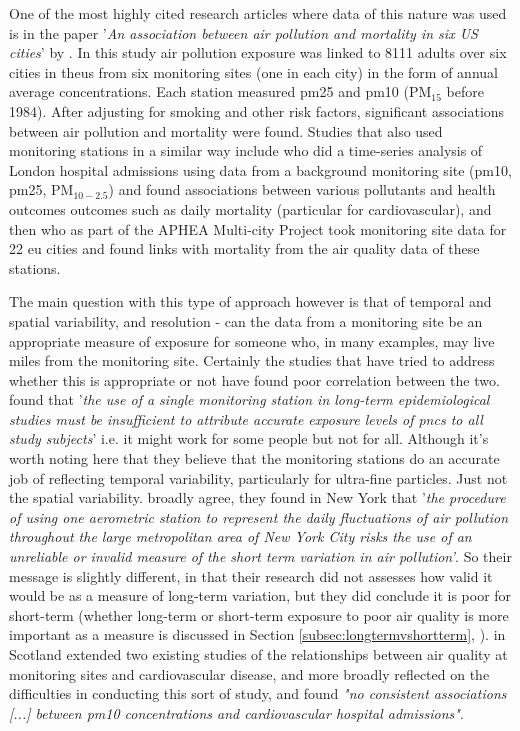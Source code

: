 One of the most highly cited research articles where data of this nature was used is in the paper '\textit{An association between air pollution and mortality in six US cities}' by \cite{Dockery1993}. In this study air pollution exposure was linked to 8111 adults over six cities in the\gls{us} from six monitoring sites (one in each city) in the form of annual average concentrations. Each station measured \gls{pm25} and \gls{pm10} (PM$_{15}$ before 1984). After adjusting for smoking and other risk factors, significant associations between air pollution and mortality were found.  Studies that also used monitoring stations in a similar way include \cite{Atkinson2010} who did a time-series analysis of London hospital admissions using data from a background monitoring site (\gls{pm10}, \gls{pm25}, PM$_{10-2.5}$) and found associations between various pollutants and health outcomes outcomes such as daily mortality (particular for cardiovascular), and then \cite{Samoli2005} who as part of the APHEA Multi-city Project took monitoring site data for 22 \gls{eu} cities and found links with mortality from the air quality data of these stations.

The main question with this type of approach however is that of temporal and spatial variability, and resolution - can the data from a monitoring site be an appropriate measure of exposure for someone who, in many examples, may live miles from the monitoring site. Certainly the studies that have tried to address whether this is appropriate or not have found poor correlation between the two. \cite{Cyrys2008} found that '\textit{the use of a single monitoring station in long-term epidemiological studies must be insufficient to attribute accurate exposure levels of \gls{pnc}s to all study subjects}' i.e. it might work for some people but not for all. Although it's worth noting here that they believe that the monitoring stations do an accurate job of reflecting temporal variability, particularly for ultra-fine particles. Just not the spatial variability. \cite{Goldstein197747} broadly agree, they found in New York that '\textit{the procedure of using one aerometric station to represent the daily fluctuations of air pollution throughout the large metropolitan area of New York City risks the use of an unreliable or invalid measure of the short term variation in air pollution'}. So their message is slightly different, in that their research did not assesses how valid it would be as a measure of long-term variation, but they did conclude it is poor for short-term (whether long-term or short-term exposure to poor air quality is more important as a measure is discussed in Section \ref{subsec:longtermvshortterm}, ). \cite{Willocks2012} in Scotland extended two existing studies of the relationships between air quality at monitoring sites and cardiovascular disease, and more broadly reflected on the difficulties in conducting this sort of study, and found \textit{"no consistent associations [...] between \gls{pm10} concentrations and cardiovascular hospital admissions"}. 

